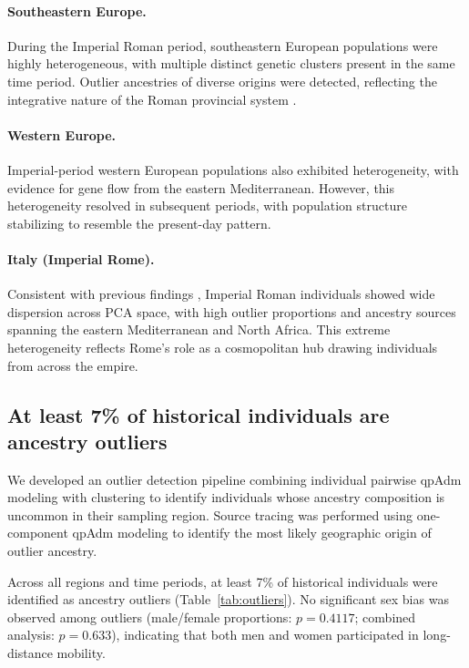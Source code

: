\documentclass[11pt]{article}
\begin{document}
\paragraph{Southeastern Europe.} During the Imperial Roman period, southeastern European populations were highly heterogeneous, with multiple distinct genetic clusters present in the same time period. Outlier ancestries of diverse origins were detected, reflecting the integrative nature of the Roman provincial system \citep{Horden2000}.

\paragraph{Western Europe.} Imperial-period western European populations also exhibited heterogeneity, with evidence for gene flow from the eastern Mediterranean. However, this heterogeneity resolved in subsequent periods, with population structure stabilizing to resemble the present-day pattern.

\paragraph{Italy (Imperial Rome).} Consistent with previous findings \citep{Antonio2019,Moots2023}, Imperial Roman individuals showed wide dispersion across PCA space, with high outlier proportions and ancestry sources spanning the eastern Mediterranean and North Africa. This extreme heterogeneity reflects Rome's role as a cosmopolitan hub drawing individuals from across the empire.

\subsection{At least 7\% of historical individuals are ancestry outliers}

We developed an outlier detection pipeline combining individual pairwise qpAdm modeling with clustering to identify individuals whose ancestry composition is uncommon in their sampling region. Source tracing was performed using one-component qpAdm modeling to identify the most likely geographic origin of outlier ancestry.

Across all regions and time periods, at least 7\% of historical individuals were identified as ancestry outliers (Table~\ref{tab:outliers}). No significant sex bias was observed among outliers (male/female proportions: $p = 0.4117$; combined analysis: $p = 0.633$), indicating that both men and women participated in long-distance mobility.
\end{document}
